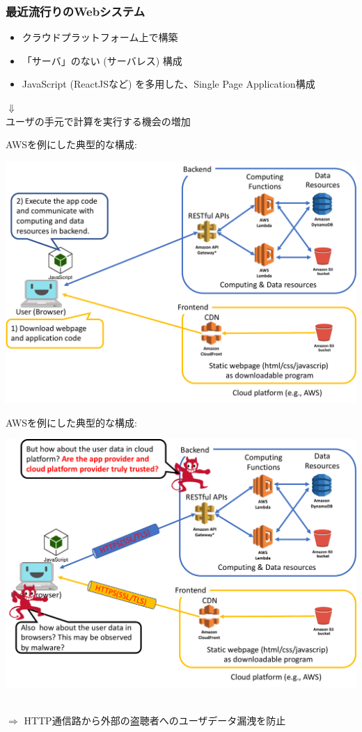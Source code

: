 \documentclass[12pt,dvipdfmx]{beamer}
\begin{document}
\begin{frame}
\frametitle{最近流行りのWebシステム}
\begin{itemize}
 \item クラウドプラットフォーム上で構築
 \item 「サーバ」のない (\alert{サーバレス}) 構成
 \item JavaScript (ReactJSなど) を多用した、Single Page Application構成
\end{itemize}
\begin{center}
$\Downarrow$\\
\alert{ユーザの手元で計算を実行する機会の増加}
\end{center}
\end{frame}

\begin{frame}
AWSを例にした典型的な構成:
\begin{center}
\includegraphics[width=0.85\linewidth]{Figs/spa1.pdf}
\end{center}
\end{frame}

\begin{frame}
AWSを例にした典型的な構成:
\begin{center}
\includegraphics[width=0.85\linewidth]{Figs/spa3.pdf}
\end{center}
\\
$\Rightarrow$ HTTP通信路から外部の盗聴者へのユーザデータ漏洩を防止
\end{frame}
\end{document}
